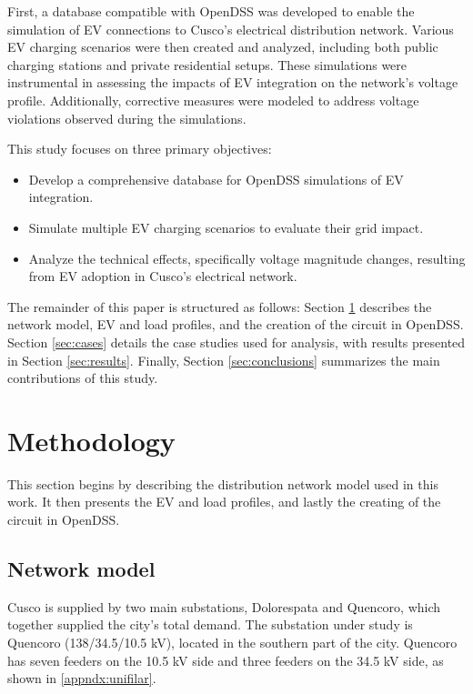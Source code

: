 \documentclass[12pt, 3p]{elsarticle}
\begin{document}
First, a database compatible with OpenDSS was developed to enable 
the simulation of EV connections to Cusco’s electrical distribution 
network. Various EV charging scenarios were then created and analyzed, 
including both public charging stations and private residential setups. 
These simulations were instrumental in assessing the impacts of EV 
integration on the network’s voltage profile. Additionally, corrective 
measures were modeled to address voltage violations observed during 
the simulations.

This study focuses on three primary objectives:

\begin{itemize}
    \item Develop a comprehensive database for OpenDSS simulations of EV integration.
    \item Simulate multiple EV charging scenarios to evaluate their grid impact.
    \item Analyze the technical effects, specifically voltage magnitude changes, resulting from EV adoption in Cusco’s electrical network.
\end{itemize}

The remainder of this paper is structured as follows:  
Section \ref{sec:methodology} describes the network model, 
EV and load profiles, and the creation of the circuit in OpenDSS.  
Section \ref{sec:cases} details the case studies used for analysis, 
with results presented in Section \ref{sec:results}.  
Finally, Section \ref{sec:conclusions} summarizes the 
main contributions of this study.

\section{Methodology}\label{sec:methodology}

This section begins by describing the distribution network
model used in this work. It then presents the EV and load
profiles, and lastly the creating of the circuit in OpenDSS.

\subsection{Network model}

Cusco is supplied by two main substations, Dolorespata and 
Quencoro, which together supplied the city's total demand. The 
substation under study is Quencoro (138/34.5/10.5 kV), 
located in the southern 
part of the city. Quencoro has seven feeders on the 10.5 kV 
side and three feeders on the 34.5 kV side, 
as shown in \ref{appndx:unifilar}.
\end{document}
